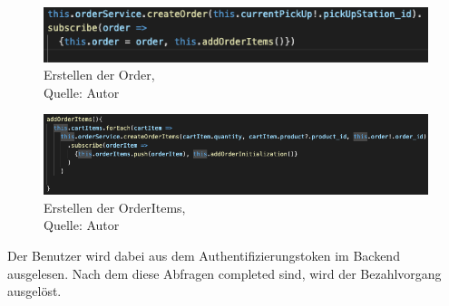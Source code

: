\begin{figure}[H]
	\centering
	\includegraphics[width=1\textwidth]{images/createOrder.PNG}
	\caption[Erstellen der Order]{Erstellen der Order,\\ Quelle: Autor}
	\label{img: createOrder}
\end{figure}
\begin{figure}[H]
	\centering
	\includegraphics[width=1\textwidth]{images/createOrderItems.PNG}
	\caption[Erstellen der OrderItems]{Erstellen der OrderItems,\\ Quelle: Autor}
	\label{img: createOrderItems}
\end{figure}

Der Benutzer wird dabei aus dem Authentifizierungstoken im Backend ausgelesen. 
Nach dem diese Abfragen completed sind, wird der Bezahlvorgang ausgelöst. 


